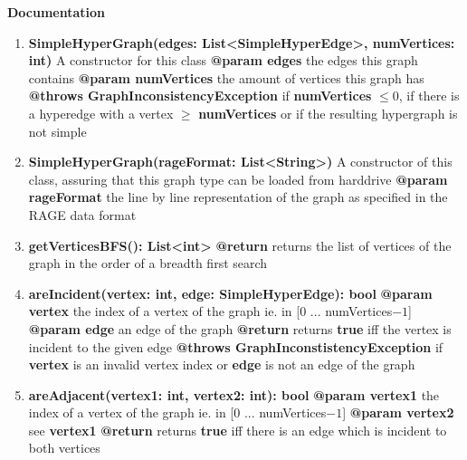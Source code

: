 	\textbf{Documentation}
	\begin{enumerate}[+]
		\item{
			\textbf{SimpleHyperGraph(edges: List<SimpleHyperEdge>, numVertices: int)} \newline
			A constructor for this class \newline
			\textbf{@param edges} the edges this graph contains \newline
			\textbf{@param numVertices} the amount of vertices this graph has \newline
			\textbf{@throws GraphInconsistencyException} if \textbf{numVertices} $\leq 0$, if there is a hyperedge with a vertex $\geq$ \textbf{numVertices} or if the resulting hypergraph is not simple
		}
		\item{
			\textbf{SimpleHyperGraph(rageFormat: List<String>)} \newline
			A constructor of this class, assuring that this graph type can be loaded from harddrive \newline
			\textbf{@param rageFormat} the line by line representation of the graph as specified in the RAGE data format
		}
		\item{
			\textbf{getVerticesBFS(): List<int>} \newline
			\textbf{@return} returns the list of vertices of the graph in the order of a breadth first search
		}
		\item{
			\textbf{areIncident(vertex: int, edge: SimpleHyperEdge): bool} \newline
			\textbf{@param vertex} the index of a vertex of the graph ie. in [0 ... numVertices$-1$]\newline
			\textbf{@param edge} an edge of the graph \newline 
			\textbf{@return} returns \textbf{true} iff the vertex is incident to the given edge \newline
			\textbf{@throws GraphInconstistencyException} if \textbf{vertex} is an invalid vertex index or \textbf{edge} is not an edge of the graph
		}
		\item{
			\textbf{areAdjacent(vertex1: int, vertex2: int): bool} \newline
			\textbf{@param vertex1} the index of a vertex of the graph ie. in [0 ... numVertices$-1$] \newline
			\textbf{@param vertex2} see \textbf{vertex1} \newline
			\textbf{@return} returns \textbf{true} iff there is an edge which is incident to both vertices \newline
}
\end{enumerate}
